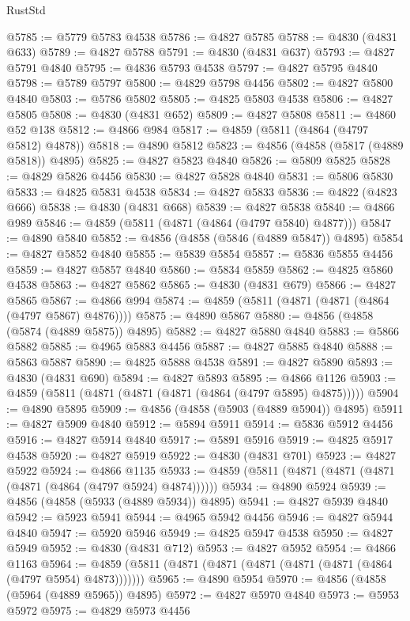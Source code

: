 \begin{lexlean}{RustStd}
\begin{coremodule}
@5785 := @5779 @5783 @4538
@5786 := @4827 @5785
@5788 := @4830 (@4831 @633)
@5789 := @4827 @5788
@5791 := @4830 (@4831 @637)
@5793 := @4827 @5791 @4840
@5795 := @4836 @5793 @4538
@5797 := @4827 @5795 @4840
@5798 := @5789 @5797
@5800 := @4829 @5798 @4456
@5802 := @4827 @5800 @4840
@5803 := @5786 @5802
@5805 := @4825 @5803 @4538
@5806 := @4827 @5805
@5808 := @4830 (@4831 @652)
@5809 := @4827 @5808
@5811 := @4860 @52 @138
@5812 := @4866 @984
@5817 := @4859 (@5811 (@4864 (@4797 @5812) @4878))
@5818 := @4890 @5812
@5823 := @4856 (@4858 (@5817 (@4889 @5818)) @4895)
@5825 := @4827 @5823 @4840
@5826 := @5809 @5825
@5828 := @4829 @5826 @4456
@5830 := @4827 @5828 @4840
@5831 := @5806 @5830
@5833 := @4825 @5831 @4538
@5834 := @4827 @5833
@5836 := @4822 (@4823 @666)
@5838 := @4830 (@4831 @668)
@5839 := @4827 @5838
@5840 := @4866 @989
@5846 := @4859 (@5811 (@4871 (@4864 (@4797 @5840) @4877)))
@5847 := @4890 @5840
@5852 := @4856 (@4858 (@5846 (@4889 @5847)) @4895)
@5854 := @4827 @5852 @4840
@5855 := @5839 @5854
@5857 := @5836 @5855 @4456
@5859 := @4827 @5857 @4840
@5860 := @5834 @5859
@5862 := @4825 @5860 @4538
@5863 := @4827 @5862
@5865 := @4830 (@4831 @679)
@5866 := @4827 @5865
@5867 := @4866 @994
@5874 := @4859 (@5811 (@4871 (@4871 (@4864 (@4797 @5867) @4876))))
@5875 := @4890 @5867
@5880 := @4856 (@4858 (@5874 (@4889 @5875)) @4895)
@5882 := @4827 @5880 @4840
@5883 := @5866 @5882
@5885 := @4965 @5883 @4456
@5887 := @4827 @5885 @4840
@5888 := @5863 @5887
@5890 := @4825 @5888 @4538
@5891 := @4827 @5890
@5893 := @4830 (@4831 @690)
@5894 := @4827 @5893
@5895 := @4866 @1126
@5903 := @4859 (@5811 (@4871 (@4871 (@4871 (@4864 (@4797 @5895) @4875)))))
@5904 := @4890 @5895
@5909 := @4856 (@4858 (@5903 (@4889 @5904)) @4895)
@5911 := @4827 @5909 @4840
@5912 := @5894 @5911
@5914 := @5836 @5912 @4456
@5916 := @4827 @5914 @4840
@5917 := @5891 @5916
@5919 := @4825 @5917 @4538
@5920 := @4827 @5919
@5922 := @4830 (@4831 @701)
@5923 := @4827 @5922
@5924 := @4866 @1135
@5933 := @4859 (@5811 (@4871 (@4871 (@4871 (@4871 (@4864 (@4797 @5924) @4874))))))
@5934 := @4890 @5924
@5939 := @4856 (@4858 (@5933 (@4889 @5934)) @4895)
@5941 := @4827 @5939 @4840
@5942 := @5923 @5941
@5944 := @4965 @5942 @4456
@5946 := @4827 @5944 @4840
@5947 := @5920 @5946
@5949 := @4825 @5947 @4538
@5950 := @4827 @5949
@5952 := @4830 (@4831 @712)
@5953 := @4827 @5952
@5954 := @4866 @1163
@5964 := @4859 (@5811 (@4871 (@4871 (@4871 (@4871 (@4871 (@4864 (@4797 @5954) @4873)))))))
@5965 := @4890 @5954
@5970 := @4856 (@4858 (@5964 (@4889 @5965)) @4895)
@5972 := @4827 @5970 @4840
@5973 := @5953 @5972
@5975 := @4829 @5973 @4456

\end{coremodule}
\end{lexlean}
